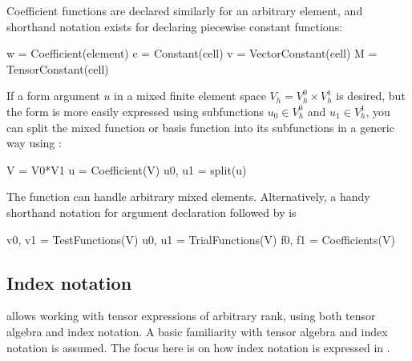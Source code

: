 Coefficient functions are declared similarly for an arbitrary element,
and shorthand notation exists for declaring piecewise constant functions:
\begin{uflcode}
w = Coefficient(element)
c = Constant(cell)
v = VectorConstant(cell)
M = TensorConstant(cell)
\end{uflcode}
If a form argument $u$ in a mixed finite element space $V_h = V_h^0
\times V_h^1$ is desired, but the form is more easily expressed using
subfunctions $u_0 \in V_h^0$ and $u_1 \in V_h^1$, you can split the
mixed function or basis function into its subfunctions in a generic way
using :
\begin{uflcode}
V = V0*V1
u = Coefficient(V)
u0, u1 = split(u)
\end{uflcode}
The  function can handle arbitrary mixed elements.
Alternatively, a handy shorthand notation for argument declaration
followed by  is
\begin{uflcode}
v0, v1 = TestFunctions(V)
u0, u1 = TrialFunctions(V)
f0, f1 = Coefficients(V)
\end{uflcode}
\subsection{Index notation}
\label{ufl:sec:indexnotation}

\ufl{} allows working with tensor expressions of arbitrary rank, using
both tensor algebra and index notation.  A basic familiarity with tensor
algebra and index notation is assumed.  The focus here is on how index
notation is expressed in \ufl{}.

